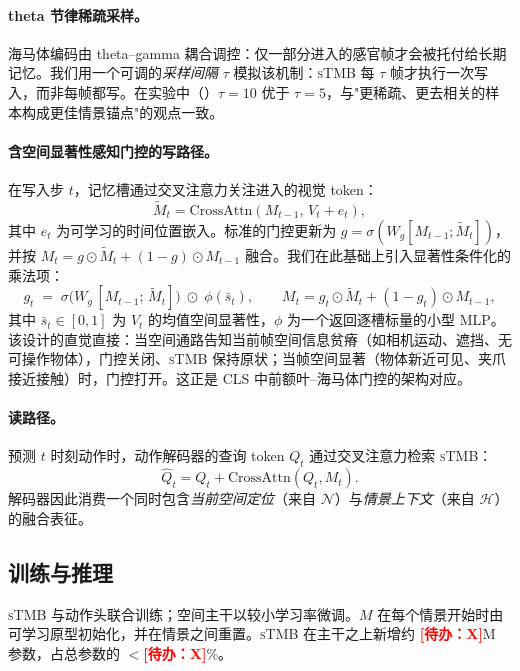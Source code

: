 \documentclass[10pt,letterpaper,fontset=fandol]{ctexart}
\newcommand{\todo}[1]{\textcolor{red}{\textbf{[待办：#1]}}}
\newcommand{\sTMB}{\textsc{sTMB}\xspace}
\begin{document}
\paragraph{theta 节律稀疏采样。}
海马体编码由 theta--gamma 耦合调控：仅一部分进入的感官帧才会被托付给长期记忆。我们用一个可调的\emph{采样间隔} $\tau$ 模拟该机制：\sTMB 每 $\tau$ 帧才执行一次写入，而非每帧都写。在实验中（）$\tau=10$ 优于 $\tau=5$，与"更稀疏、更去相关的样本构成更佳情景锚点"的观点一致。

\paragraph{含空间显著性感知门控的写路径。}
\label{sec:gate}
在写入步 $t$，记忆槽通过交叉注意力关注进入的视觉 token：
\begin{equation}
    \tilde M_t = \mathrm{CrossAttn}(M_{t-1},\, V_t + e_t),
\end{equation}
其中 $e_t$ 为可学习的时间位置嵌入。标准的门控更新为 $g = \sigma(W_g[M_{t-1};\tilde M_t])$，并按 $M_t = g \odot \tilde M_t + (1{-}g)\odot M_{t-1}$ 融合。我们在此基础上引入显著性条件化的乘法项：
\begin{equation}
    g_t \;=\; \sigma\!\bigl(W_g\, [M_{t-1};\,\tilde M_t]\bigr) \;\odot\; \phi(\bar s_t),\qquad
    M_t = g_t \odot \tilde M_t + (1 - g_t) \odot M_{t-1},
    \label{eq:gate}
\end{equation}
其中 $\bar s_t \in [0,1]$ 为 $V_t$ 的均值空间显著性，$\phi$ 为一个返回逐槽标量的小型 MLP。该设计的直觉直接：当空间通路告知当前帧空间信息贫瘠（如相机运动、遮挡、无可操作物体），门控关闭、\sTMB 保持原状；当帧空间显著（物体新近可见、夹爪接近接触）时，门控打开。这正是 CLS 中前额叶--海马体门控的架构对应。

\paragraph{读路径。}
预测 $t$ 时刻动作时，动作解码器的查询 token $Q_t$ 通过交叉注意力检索 \sTMB：
\begin{equation}
    \hat Q_t = Q_t + \mathrm{CrossAttn}(Q_t, M_t).
\end{equation}
解码器因此消费一个同时包含\emph{当前空间定位}（来自 $\mathcal{N}$）与\emph{情景上下文}（来自 $\mathcal{H}$）的融合表征。

\subsection{训练与推理}
\sTMB 与动作头联合训练；空间主干以较小学习率微调。$M$ 在每个情景开始时由可学习原型初始化，并在情景之间重置。\sTMB 在主干之上新增约 \todo{X}M 参数，占总参数的 $<$\todo{X}\%。
\end{document}

